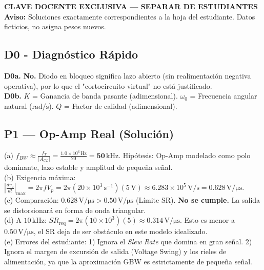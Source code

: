 \documentclass[10pt, a4paper]{article}
\begin{document}
\begin{center}
    {\Large\textbf{\textcolor{red!70!black}{CLAVE DOCENTE EXCLUSIVA — SEPARAR DE ESTUDIANTES}}} \\[0.1cm]
    {\footnotesize\textbf{Aviso:} Soluciones exactamente correspondientes a la hoja del estudiante. Datos ficticios, no asigna pesos nuevos.}
\end{center}

\subsection*{D0 - Diagnóstico Rápido}
\textbf{D0a.} \textbf{No.} Diodo en bloqueo significa lazo abierto (sin realimentación negativa operativa), por lo que el "cortocircuito virtual" no está justificado.\\
\textbf{D0b.} $K$ = Ganancia de banda pasante (adimensional). $\omega_0$ = Frecuencia angular natural ($\mathrm{rad/s}$). $Q$ = Factor de calidad (adimensional).

\subsection*{P1 — Op-Amp Real (Solución)}
(a) $f_{BW} \approx \frac{f_T}{|A_{CL}|} = \frac{1.0 \times 10^6\,\mathrm{Hz}}{20} = \mathbf{50\,\mathrm{kHz}}$. Hipótesis: Op-Amp modelado como polo dominante, lazo estable y amplitud de pequeña señal. \\
(b) Exigencia máxima: $\left| \frac{dv_o}{dt} \right|_{\max} = 2\pi f V_p = 2\pi (20\times 10^3\,\mathrm{s}^{-1})(5\,\mathrm{V}) \approx 6.283\times 10^5\,\mathrm{V/s} = \mathbf{0.628\,\mathrm{V/\mu s}}$. \\
(c) Comparación: $0.628\,\mathrm{V/\mu s} > 0.50\,\mathrm{V/\mu s}$ (Límite SR). \textbf{No se cumple.} La salida se distorsionará en forma de onda triangular. \\
(d) A $10\,\mathrm{kHz}$: $SR_{\mathrm{req}} = 2\pi (10\times 10^3)(5) \approx \mathbf{0.314\,\mathrm{V/\mu s}}$. Esto es menor a $0.50\,\mathrm{V/\mu s}$, el SR deja de ser obstáculo en este modelo idealizado. \\
(e) Errores del estudiante: 1) Ignora el \textit{Slew Rate} que domina en gran señal. 2) Ignora el margen de excursión de salida (Voltage Swing) y los rieles de alimentación, ya que la aproximación GBW es estrictamente de pequeña señal.
\end{document}
